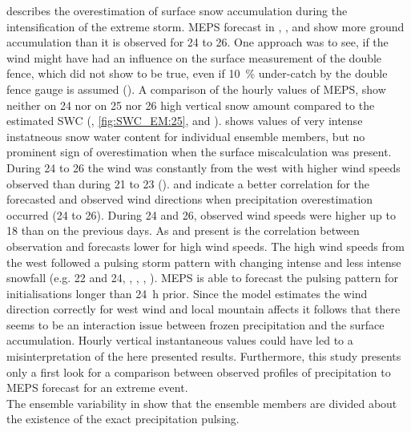  describes the overestimation of surface snow accumulation during the intensification of the extreme storm. MEPS forecast in , , and  show more ground accumulation than it is observed for \num{24} to \SI{26}{\dec}. One approach was to see, if the wind might have had an influence on the surface measurement of the double fence, which did not show to be true, even if \SI{10}{\percent} under-catch by the double fence gauge is assumed (). A comparison of the hourly values of MEPS, show neither on \num{24} nor on \num{25} nor \SI{26}{\dec} high vertical snow amount compared to the estimated SWC (, \ref{fig:SWC_EM:25}, and ).  shows values of very intense instatneous snow water content for individual ensemble members, but no prominent sign of overestimation when the surface miscalculation was present. 
\\
During \num{24} to \SI{26}{\dec} the wind was constantly from the west with higher wind speeds observed than during \num{21} to \SI{23}{\dec} ().  and  indicate a better correlation for the forecasted and observed wind directions when precipitation overestimation occurred (\num{24} to \SI{26}{\dec}). During \num{24} and \SI{26}{\dec}, observed wind speeds were higher up to \SI{18}{\mPs} than on the previous days. As  and  present is the correlation between observation and forecasts lower for high wind speeds. The high wind speeds from the west followed a pulsing storm pattern with changing intense and less intense snowfall (e.g. \num{22} and \SI{24}{\dec}, , , , ). MEPS is able to forecast the pulsing pattern for initialisations longer than \SI{24}{\hour} prior. Since the model estimates the wind direction correctly for west wind and local mountain affects it follows that there seems to be an interaction issue between frozen precipitation and the surface accumulation. Hourly vertical instantaneous values could have led to a misinterpretation of the here presented results. Furthermore, this study presents only a first look for a comparison between observed profiles of precipitation to MEPS forecast for an extreme event.   
\\
The ensemble variability in  show that the ensemble members are divided about the existence of the exact precipitation pulsing. 
